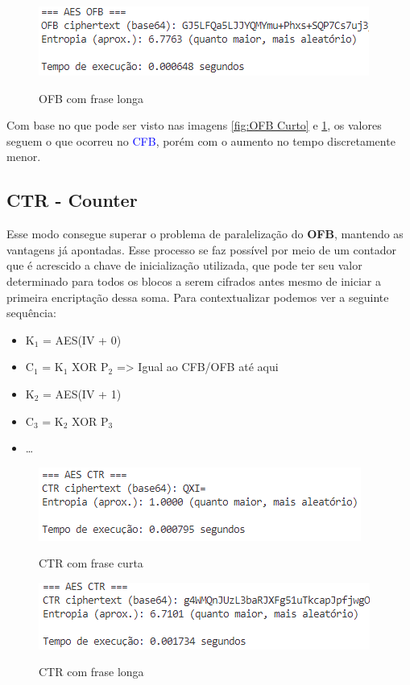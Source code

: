 \documentclass[12pt]{article}
\newcommand{\blue}[1]{\textcolor{blue}{#1}}
\begin{document}
\begin{figure}[h]
    \caption{OFB com frase longa}
    \centering
    \includegraphics[width = 0.5\linewidth]{Imagens/OFB-longo.png}  
    \label{fig:OFB Longo}
\end{figure}

Com base no que pode ser visto nas imagens \ref{fig:OFB Curto} e \ref{fig:OFB Longo}, os valores seguem o que ocorreu no \blue{CFB}, porém com o aumento no tempo discretamente menor.

\subsection{CTR - Counter}
Esse modo consegue superar o problema de paralelização do \textbf{OFB}, mantendo as vantagens já apontadas. Esse processo se faz possível por meio de um contador que é acrescido a chave de inicialização utilizada, que pode ter seu valor determinado para todos os blocos a serem cifrados antes mesmo de iniciar a primeira encriptação dessa soma. Para contextualizar podemos ver a seguinte sequência:

\begin{itemize}
  \item K$_{1}$ = AES(IV + 0)
  \item C$_{1}$ = K$_{1}$ XOR P$_{2}$ => Igual ao CFB/OFB até aqui
  \item K$_{2}$ = AES(IV + 1)
  \item C$_{3}$ = K$_{2}$ XOR P$_{3}$
  \item \dots
\end{itemize}

\begin{figure}[h]
    \caption{CTR com frase curta}
    \centering
    \includegraphics[width = 0.5\linewidth]{Imagens/CTR-curto.png}  
    \label{fig:CTR Curto}
\end{figure}

\begin{figure}[h]
    \caption{CTR com frase longa}
    \centering
    \includegraphics[width = 0.5\linewidth]{Imagens/CTR-longo.png}  
    \label{fig:CTR Longo}
\end{figure}
\end{document}
